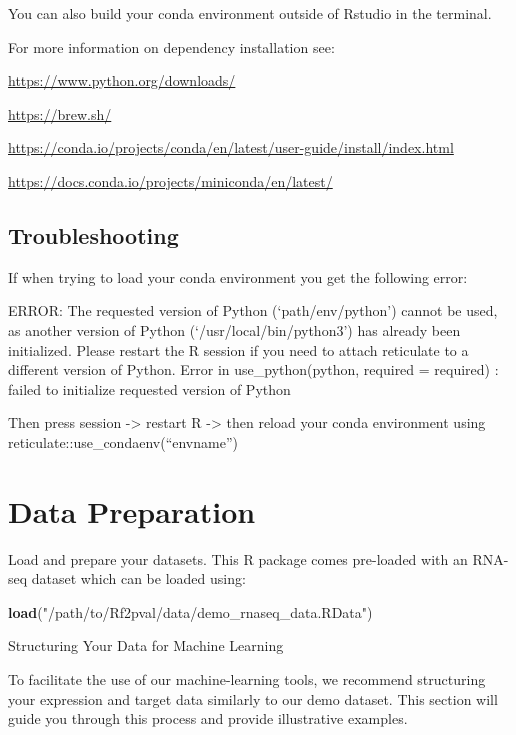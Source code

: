 \documentclass[
]{article}
\newenvironment{Shaded}{\begin{snugshade}}{\end{snugshade}}
\newcommand{\FunctionTok}[1]{\textcolor[rgb]{0.13,0.29,0.53}{\textbf{#1}}}
\newcommand{\NormalTok}[1]{#1}
\newcommand{\StringTok}[1]{\textcolor[rgb]{0.31,0.60,0.02}{#1}}
\begin{document}
You can also build your conda environment outside of Rstudio in the
terminal.

For more information on dependency installation see:

\url{https://www.python.org/downloads/}

\url{https://brew.sh/}

\url{https://conda.io/projects/conda/en/latest/user-guide/install/index.html}

\url{https://docs.conda.io/projects/miniconda/en/latest/}

\hypertarget{troubleshooting}{%
\subsection{Troubleshooting}\label{troubleshooting}}

If when trying to load your conda environment you get the following
error:

ERROR: The requested version of Python (`path/env/python') cannot be
used, as another version of Python (`/usr/local/bin/python3') has
already been initialized. Please restart the R session if you need to
attach reticulate to a different version of Python. Error in
use\_python(python, required = required) : failed to initialize
requested version of Python

Then press session -\textgreater{} restart R -\textgreater{} then reload
your conda environment using reticulate::use\_condaenv(``envname'')

\hypertarget{data-preparation}{%
\section{Data Preparation}\label{data-preparation}}

Load and prepare your datasets. This R package comes pre-loaded with an
RNA-seq dataset which can be loaded using:

\begin{Shaded}
\begin{Highlighting}[]
\FunctionTok{load}\NormalTok{(}\StringTok{"/path/to/Rf2pval/data/demo\_rnaseq\_data.RData"}\NormalTok{)}
\end{Highlighting}
\end{Shaded}

Structuring Your Data for Machine Learning

To facilitate the use of our machine-learning tools, we recommend
structuring your expression and target data similarly to our demo
dataset. This section will guide you through this process and provide
illustrative examples.
\end{document}
